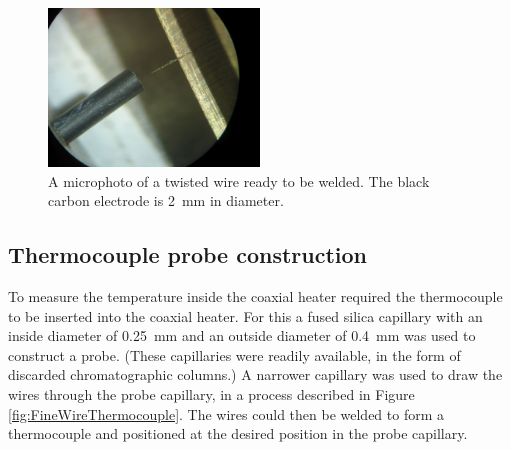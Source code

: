 \begin{figure}
	\centering
	\includegraphics[width=0.5\textwidth]{Figures/WelderMicro.jpg}
	\decoRule
	
\caption[A microphoto of a thermocouple twist ready to be welded.]{A microphoto
of a twisted wire ready to be welded. The black carbon electrode is
\SI{2}{\milli\metre} in diameter.}
	
	\label{fig:TCWeldMicro}
\end{figure}

\subsection{Thermocouple probe construction}

To measure the temperature inside the coaxial heater required the thermocouple
to be inserted into the coaxial heater. For this a fused silica capillary with
an inside diameter of \SI{0.25}{\milli\metre} and an outside diameter of
\SI{0.4}{\milli\metre} was used to construct a probe. (These capillaries were
readily available, in the form of discarded chromatographic columns.) A narrower
capillary was used to draw the wires through the probe capillary, in a process
described in Figure \ref{fig:FineWireThermocouple}. The wires could then be
welded to form a thermocouple and positioned at the desired position in the
probe capillary.

